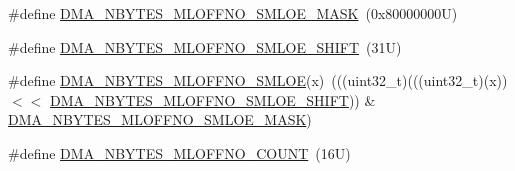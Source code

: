 \begin{DoxyCompactItemize}
\item 
\#define \mbox{\hyperlink{group___d_m_a___register___masks_gafda1d79fea3353361f7ae8b49c44e20f}{D\+M\+A\+\_\+\+N\+B\+Y\+T\+E\+S\+\_\+\+M\+L\+O\+F\+F\+N\+O\+\_\+\+S\+M\+L\+O\+E\+\_\+\+M\+A\+SK}}~(0x80000000\+U)
\item 
\#define \mbox{\hyperlink{group___d_m_a___register___masks_ga7fe83f71aff1752703f2ec145d70571a}{D\+M\+A\+\_\+\+N\+B\+Y\+T\+E\+S\+\_\+\+M\+L\+O\+F\+F\+N\+O\+\_\+\+S\+M\+L\+O\+E\+\_\+\+S\+H\+I\+FT}}~(31\+U)
\item 
\#define \mbox{\hyperlink{group___d_m_a___register___masks_gaf24c9cd00e8d1e2f980a3129f48d06e2}{D\+M\+A\+\_\+\+N\+B\+Y\+T\+E\+S\+\_\+\+M\+L\+O\+F\+F\+N\+O\+\_\+\+S\+M\+L\+OE}}(x)~(((uint32\+\_\+t)(((uint32\+\_\+t)(x)) $<$$<$ \mbox{\hyperlink{group___d_m_a___register___masks_ga7fe83f71aff1752703f2ec145d70571a}{D\+M\+A\+\_\+\+N\+B\+Y\+T\+E\+S\+\_\+\+M\+L\+O\+F\+F\+N\+O\+\_\+\+S\+M\+L\+O\+E\+\_\+\+S\+H\+I\+FT}})) \& \mbox{\hyperlink{group___d_m_a___register___masks_gafda1d79fea3353361f7ae8b49c44e20f}{D\+M\+A\+\_\+\+N\+B\+Y\+T\+E\+S\+\_\+\+M\+L\+O\+F\+F\+N\+O\+\_\+\+S\+M\+L\+O\+E\+\_\+\+M\+A\+SK}})
\item 
\#define \mbox{\hyperlink{group___d_m_a___register___masks_ga9fd726a7af6f70699b3bbcfc5dfecbe7}{D\+M\+A\+\_\+\+N\+B\+Y\+T\+E\+S\+\_\+\+M\+L\+O\+F\+F\+N\+O\+\_\+\+C\+O\+U\+NT}}~(16\+U)
\end{DoxyCompactItemize}
